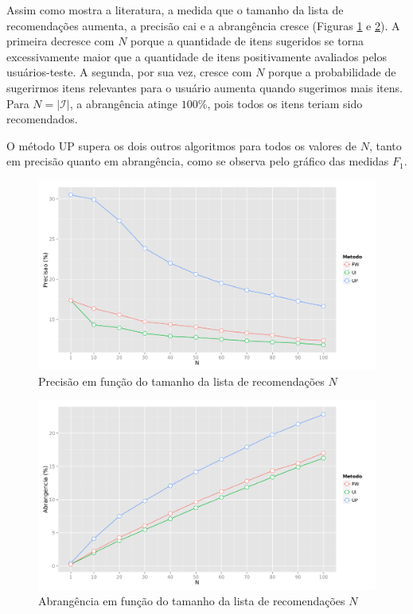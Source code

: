 Assim como mostra a literatura, a medida que o tamanho da lista de recomendações aumenta, a precisão cai e a abrangência cresce (Figuras \ref{fig:precision_N} e \ref{fig:recall_N}). A primeira decresce com $N$ porque a quantidade de itens sugeridos se torna excessivamente maior que a quantidade de itens positivamente avaliados pelos usuários-teste. A segunda, por sua vez, cresce com $N$ porque a probabilidade de sugerirmos itens relevantes para o usuário aumenta quando sugerimos mais itens. Para $N=\left|\mathcal{I}\right|$, a abrangência atinge $100\%$, pois todos os itens teriam sido recomendados.

O método UP supera os dois outros algoritmos para todos os valores de $N$, tanto em precisão quanto em abrangência, como se observa pelo gráfico das medidas $F_1$.

\begin{figure}[htp]
    \begin{center}
    \includegraphics[width=1\textwidth]{img/precision_N}
    \end{center}
    \caption{Precisão em função do tamanho da lista de recomendações $N$}
    \label{fig:precision_N}
\end{figure}


\begin{figure}[htp]
    \begin{center}
    \includegraphics[width=1\textwidth]{img/recall_N}
    \end{center}
    \caption{Abrangência em função do tamanho da lista de recomendações $N$}
    \label{fig:recall_N}
\end{figure}


